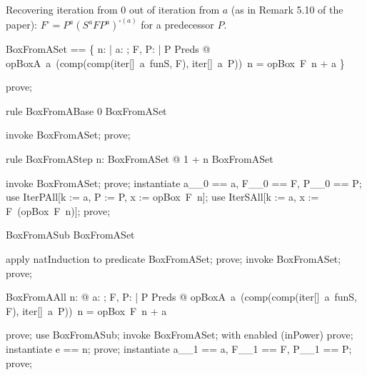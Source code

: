 \documentclass{article}
\begin{document}
Recovering iteration from $0$ out of iteration from $a$ (as in Remark 5.10 of the paper):
$F^\square = P^a (S^a F P^a)^{\square(a)}$ for a predecessor $P$.

\begin{zed}
  BoxFromASet == \{ n: \nat | \forall a: \nat; F, P: \nat \fun \nat | P \in Preds @ opBoxA~a~(comp(comp(iter[\nat]~a~funS, F), iter[\nat]~a~P))~n = opBox~F~n + a \}
\end{zed}

\begin{zproof}
prove;
\end{zproof}

\begin{theorem}{rule BoxFromABase}
  0 \in BoxFromASet
\end{theorem}

\begin{zproof}
invoke BoxFromASet;
prove;
\end{zproof}

\begin{theorem}{rule BoxFromAStep}
  \forall n: BoxFromASet @ 1 + n \in BoxFromASet
\end{theorem}

\begin{zproof}
invoke BoxFromASet;
prove;
instantiate a\_\_0 == a, F\_\_0 == F, P\_\_0 == P;
use IterPAll[k := a, P := P, x := opBox~F~n];
use IterSAll[k := a, x := F~(opBox~F~n)];
prove;
\end{zproof}

\begin{theorem}{BoxFromASub}
  \nat \subseteq BoxFromASet
\end{theorem}

\begin{zproof}
apply natInduction to predicate \nat \subseteq BoxFromASet;
prove;
invoke BoxFromASet;
prove;
\end{zproof}

\begin{theorem}{BoxFromAAll}
  \forall n: \nat @ \forall a: \nat; F, P: \nat \fun \nat | P \in Preds @ opBoxA~a~(comp(comp(iter[\nat]~a~funS, F), iter[\nat]~a~P))~n = opBox~F~n + a
\end{theorem}

\begin{zproof}
prove;
use BoxFromASub;
invoke BoxFromASet;
with enabled (inPower) prove;
instantiate e == n;
prove;
instantiate a\_\_1 == a, F\_\_1 == F, P\_\_1 == P;
prove;
\end{zproof}
\end{document}
